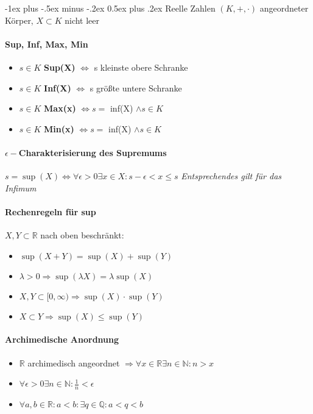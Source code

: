 \documentclass[paper=a3,paper=landscape, fontsize=9pt,DIV=25]{scrartcl}
\makeatletter
\newcommand{\real}{{\mathbb{R}}}
\newcommand{\nat}{\mathbb{N}}
\renewcommand{\section}{\@startsection{section}{1}{0mm}%
  {-1ex plus -.5ex minus -.2ex}%
  {0.5ex plus .2ex}%
  {\color{blue}\normalfont\large\bfseries}}
\makeatother
\begin{document}
\begin{multicols*}{4}
	
	\section{Reelle Zahlen}
	$(K,+,\cdot)$ angeordneter Körper, $X \subset K$ nicht leer
	\paragraph{Sup, Inf, Max, Min}
	\begin{itemize}
		\item $s \in K$ \textbf{Sup(X)} $\Leftrightarrow$ s kleinste obere Schranke
		\item $s \in K$ \textbf{Inf(X)} $\Leftrightarrow$ s größte untere Schranke
		\item $s \in K$ \textbf{Max(x)} $\Leftrightarrow s =$ inf(X) $\wedge s \in K$
		\item $s \in K$ \textbf{Min(x)} $\Leftrightarrow s =$ inf(X) $\wedge s \in K$
	\end{itemize}
	\paragraph{$\epsilon-$Charakterisierung des Supremums}
	$s = \sup(X) \Leftrightarrow \forall \epsilon > 0 \exists x \in X: s-\epsilon < x \leq s$
	\textit{Entsprechendes gilt für das Infimum}
	\paragraph{Rechenregeln für sup}
	$X,Y \subset \real$ nach oben beschränkt:
	\begin{itemize}
		\item $\sup(X+Y) = \sup(X) + \sup(Y)$
		\item $\lambda > 0 \Rightarrow \sup(\lambda X) = \lambda \sup(X)$
		\item $X,Y \subset [0,\infty) \Rightarrow \sup(X) \cdot \sup(Y)$
		\item $X \subset Y \Rightarrow \sup(X) \leq \sup(Y)$
	\end{itemize}
\paragraph{Archimedische Anordnung}
\begin{itemize}
	\item $\real$ archimedisch angeordnet $\Rightarrow \forall x \in \real \exists n \in \nat: n > x$
	\item $\forall \epsilon > 0 \exists n \in \nat: \frac{1}{n} < \epsilon$
	\item $\forall a,b \in \real: a < b: \exists q \in \mathbb{Q}: a<q<b$
\end{itemize}


\end{multicols*}
\end{document}
